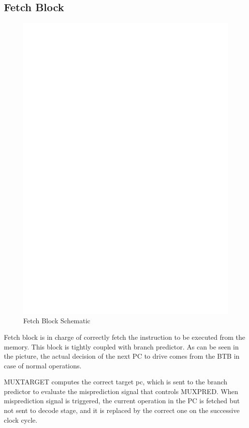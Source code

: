 \documentclass[12pt]{article}
\begin{document}
\subsection{Fetch Block}
\begin{figure}[h!]
	\includegraphics[width=\textwidth, center]{images/FETCH_BLOCK.eps}
	\caption{Fetch Block Schematic}
	\label{FETCHBLOCK}
\end{figure}
Fetch block is in charge of correctly fetch the instruction to be executed from the memory. This block is tightly coupled with branch predictor. As can be seen in the picture, the actual decision of the next PC to drive comes from the BTB in case of normal operations.

MUXTARGET computes the correct target pc, which is sent to the branch predictor to evaluate the misprediction signal that controls MUXPRED.
When misprediction signal is triggered, the current operation in the PC is fetched but not sent to decode stage, and it is replaced by the correct one on the successive clock cycle.
\end{document}
